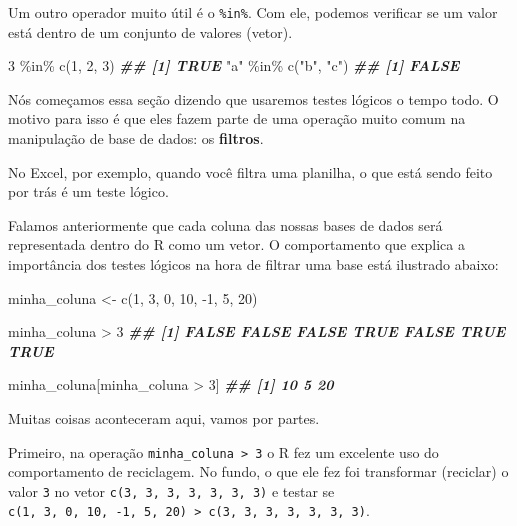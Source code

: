 \documentclass[
]{book}
\newenvironment{Shaded}{\begin{snugshade}}{\end{snugshade}}
\newcommand{\DecValTok}[1]{\textcolor[rgb]{0.00,0.00,0.81}{#1}}
\newcommand{\DocumentationTok}[1]{\textcolor[rgb]{0.56,0.35,0.01}{\textbf{\textit{#1}}}}
\newcommand{\FunctionTok}[1]{\textcolor[rgb]{0.00,0.00,0.00}{#1}}
\newcommand{\NormalTok}[1]{#1}
\newcommand{\OtherTok}[1]{\textcolor[rgb]{0.56,0.35,0.01}{#1}}
\newcommand{\SpecialCharTok}[1]{\textcolor[rgb]{0.00,0.00,0.00}{#1}}
\newcommand{\StringTok}[1]{\textcolor[rgb]{0.31,0.60,0.02}{#1}}
\begin{document}
Um outro operador muito útil é o \texttt{\%in\%}. Com ele, podemos verificar se um valor está dentro de um conjunto de valores (vetor).

\begin{Shaded}
\begin{Highlighting}[]
\DecValTok{3} \SpecialCharTok{\%in\%} \FunctionTok{c}\NormalTok{(}\DecValTok{1}\NormalTok{, }\DecValTok{2}\NormalTok{, }\DecValTok{3}\NormalTok{)}
\DocumentationTok{\#\# [1] TRUE}
\StringTok{"a"} \SpecialCharTok{\%in\%} \FunctionTok{c}\NormalTok{(}\StringTok{"b"}\NormalTok{, }\StringTok{"c"}\NormalTok{)}
\DocumentationTok{\#\# [1] FALSE}
\end{Highlighting}
\end{Shaded}

Nós começamos essa seção dizendo que usaremos testes lógicos o tempo todo. O motivo para isso é que eles fazem parte de uma operação muito comum na manipulação de base de dados: os \textbf{filtros}.

No Excel, por exemplo, quando você filtra uma planilha, o que está sendo feito por trás é um teste lógico.

Falamos anteriormente que cada coluna das nossas bases de dados será representada dentro do R como um vetor. O comportamento que explica a importância dos testes lógicos na hora de filtrar uma base está ilustrado abaixo:

\begin{Shaded}
\begin{Highlighting}[]
\NormalTok{minha\_coluna }\OtherTok{\textless{}{-}} \FunctionTok{c}\NormalTok{(}\DecValTok{1}\NormalTok{, }\DecValTok{3}\NormalTok{, }\DecValTok{0}\NormalTok{, }\DecValTok{10}\NormalTok{, }\SpecialCharTok{{-}}\DecValTok{1}\NormalTok{, }\DecValTok{5}\NormalTok{, }\DecValTok{20}\NormalTok{)}

\NormalTok{minha\_coluna }\SpecialCharTok{\textgreater{}} \DecValTok{3}
\DocumentationTok{\#\# [1] FALSE FALSE FALSE  TRUE FALSE  TRUE  TRUE}

\NormalTok{minha\_coluna[minha\_coluna }\SpecialCharTok{\textgreater{}} \DecValTok{3}\NormalTok{]}
\DocumentationTok{\#\# [1] 10  5 20}
\end{Highlighting}
\end{Shaded}

Muitas coisas aconteceram aqui, vamos por partes.

Primeiro, na operação \texttt{minha\_coluna\ \textgreater{}\ 3} o R fez um excelente uso do comportamento de reciclagem. No fundo, o que ele fez foi transformar (reciclar) o valor \texttt{3} no vetor \texttt{c(3,\ 3,\ 3,\ 3,\ 3,\ 3,\ 3)} e testar se \texttt{c(1,\ 3,\ 0,\ 10,\ -1,\ 5,\ 20)\ \textgreater{}\ c(3,\ 3,\ 3,\ 3,\ 3,\ 3,\ 3)}.
\end{document}
